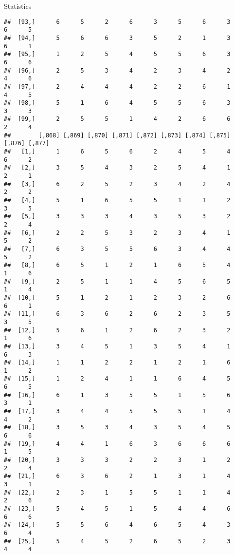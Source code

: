 \documentclass[
  ignorenonframetext,
]{beamer}
\begin{document}
\begin{frame}[fragile]{Statistics}
\begin{verbatim}
##  [93,]      6      5      2      6      3      5      6      3      6      5
##  [94,]      5      6      6      3      5      2      1      3      6      1
##  [95,]      1      2      5      4      5      5      6      3      6      6
##  [96,]      2      5      3      4      2      3      4      2      4      6
##  [97,]      2      4      4      4      2      2      6      1      4      5
##  [98,]      5      1      6      4      5      5      6      3      3      3
##  [99,]      2      5      5      1      4      2      6      6      2      4
##        [,868] [,869] [,870] [,871] [,872] [,873] [,874] [,875] [,876] [,877]
##   [1,]      1      6      5      6      2      4      5      4      6      2
##   [2,]      3      5      4      3      2      5      4      1      2      1
##   [3,]      6      2      5      2      3      4      2      4      2      2
##   [4,]      5      1      6      5      5      1      1      2      3      5
##   [5,]      3      3      3      4      3      5      3      2      2      4
##   [6,]      2      2      5      3      2      3      4      1      5      2
##   [7,]      6      3      5      5      6      3      4      4      5      2
##   [8,]      6      5      1      2      1      6      5      4      1      6
##   [9,]      2      5      1      1      4      5      6      5      1      4
##  [10,]      5      1      2      1      2      3      2      6      6      1
##  [11,]      6      3      6      2      6      2      3      5      3      5
##  [12,]      5      6      1      2      6      2      3      2      1      6
##  [13,]      3      4      5      1      3      5      4      1      6      3
##  [14,]      1      1      2      2      1      2      1      6      1      2
##  [15,]      1      2      4      1      1      6      4      5      6      5
##  [16,]      6      1      3      5      5      1      5      6      3      1
##  [17,]      3      4      4      5      5      5      1      4      4      2
##  [18,]      3      5      3      4      3      5      4      5      6      6
##  [19,]      4      4      1      6      3      6      6      6      1      5
##  [20,]      3      3      3      2      2      3      1      2      2      4
##  [21,]      6      3      6      2      1      3      1      4      3      1
##  [22,]      2      3      1      5      5      1      1      4      2      6
##  [23,]      5      4      5      1      5      4      4      6      6      6
##  [24,]      5      5      6      4      6      5      4      3      6      4
##  [25,]      5      4      5      2      6      5      2      3      4      4

\end{verbatim}
\end{frame}
\end{document}
